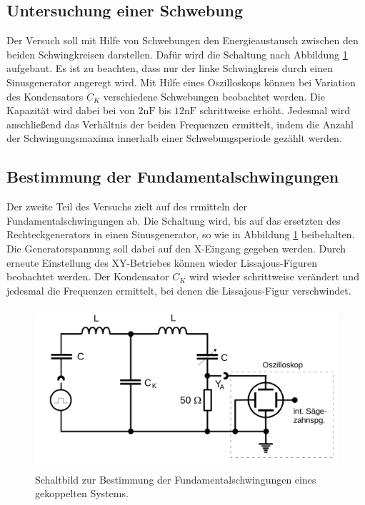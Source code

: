 \subsection{Untersuchung einer Schwebung} 
\label{sub:Untersuchung einer Schwebung}



Der Versuch soll mit Hilfe von Schwebungen den Energieaustausch zwischen den beiden Schwingkreisen darstellen.
Dafür wird die Schaltung nach Abbildung \ref{fig:bild6} aufgebaut. Es ist zu beachten, dass nur der linke Schwingkreis durch einen Sinusgenerator angeregt wird.
Mit Hilfe eines Oszilloskops können bei Variation des 
Kondensators $C_K$ verschiedene Schwebungen beobachtet werden. Die Kapazität wird dabei bei von $2\si{\nano\farad}$  bis $12\si{\nano\farad}$
schrittweise erhöht. Jedesmal wird anschließend das Verhältnis der beiden Frequenzen ermittelt, indem die Anzahl der Schwingungsmaxima innerhalb einer Schwebungsperiode 
gezählt werden.


\subsection{Bestimmung der Fundamentalschwingungen}
\label{sub:Bestimmung der Fundamentalschwingungen}



Der zweite Teil des Versuchs zielt auf des rrmitteln der Fundamentalschwingungen ab. Die Schaltung wird, bis auf das ersetzten des Rechteckgenerators in
einen Sinusgenerator, so wie in Abbildung \ref{fig:bild6} beibehalten. Die Generatorspannung soll dabei auf den X-Eingang gegeben werden.
Durch erneute Einstellung des XY-Betriebes können wieder Lissajous-Figuren beobachtet werden. Der Kondensator $C_K$ wird wieder schrittweise verändert und jedesmal die Frequenzen ermittelt, bei 
denen die Lissajous-Figur verschwindet. 


\begin{figure}

    \centering
    \includegraphics[height=6.0cm]{data/Bild6.png}
    \caption{Schaltbild zur Bestimmung der Fundamentalschwingungen eines gekoppelten Systems.}
    \label{fig:bild6}
\end{figure}



